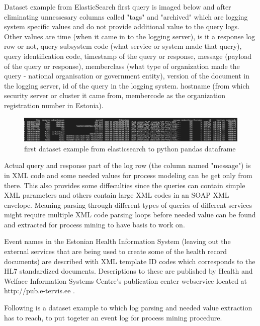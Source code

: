 \documentclass[a4paper, 12pt]{article}
\begin{document}
Dataset example from ElasticSearch first query is imaged below and after eliminating unnessesary columns called "tags" and "archived" which are logging system specific values and do not provide additional value to the query logs. Other values are time (when it came in to the logging server), is it a response log row or not, query subsystem code (what service or system made that query), query identification code, timestamp of the query or response, message (payload of the query or response), memberclass (what type of organization made the query - national organisation or government entity), version of the document in the logging server, id of the query in the logging system. hostname (from which security server or cluster it came from, membercode as the organization registration number in Estonia). 

\begin{figure}[h]
	\centering
	\includegraphics[width=15cm]{img/first_dataset_example.png} %
	\caption{first dataset example from elasticsearch to python pandas dataframe}
	\label{fig:first dataset example}
\end{figure}

Actual query and response part of the log row (the column named "message") is in XML code and some needed values for process modeling can be get only from there. This also provides some diffeculties since the queries can contain simple XML parameters and others contain large XML codes in an SOAP XML envelope. Meaning parsing through different types of queries of different services might require multiple XML code parsing loops before needed value can be found and extracted for process mining to have basis to work on. 

 Event names in the Estonian Health Information System (leaving out the external services that are being used to create some of the health record documents) are described with XML template ID codes which corresponds to the HL7 standardized documents. Descriptions to these are published by Health and Welface Information Systems Centre's publication center webservice located at http://pub.e-tervis.ee . 

Following is a dataset example to which log parsing and needed value extraction has to reach, to put togeter an event log for process mining procedure. 
\end{document}
